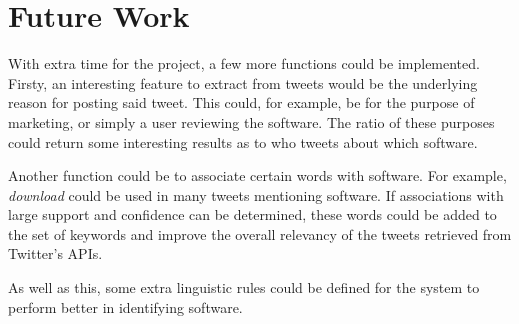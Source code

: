 \section{Future Work}
With extra time for the project, a few more functions could be implemented. Firsty, an interesting feature to extract from tweets would be the underlying reason for posting said tweet. This could, for example, be for the purpose of marketing, or simply a user reviewing the software. The ratio of these purposes could return some interesting results as to who tweets about which software. 

Another function could be to associate certain words with software. For example, \emph{download} could be used in many tweets mentioning software. If associations with large support and confidence can be determined, these words could be added to the set of keywords and improve the overall relevancy of the tweets retrieved from Twitter's APIs.

As well as this, some extra linguistic rules could be defined for the system to perform better in identifying software.

